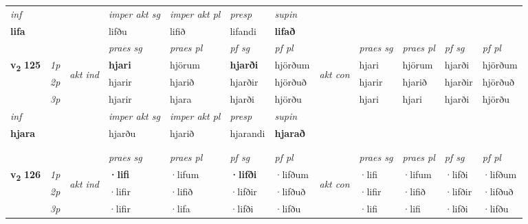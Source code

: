 \begin{longtable}[l]{X>{\footnotesize\itshape}llXXXXlXXXX}
   {\textit{inf}} & &  & \textit{imper akt sg} & \textit{imper akt pl}   & \textit{presp} & \textit{supin}   \\*
  {\textbf{lifa}} & && lifðu  & lifið   & lifandi &  \textbf{lifað}   \\*

\midrule

 & &   & \textit{praes sg}  & \textit{praes pl}    & \textit{ pf sg} & \textit{pf pl} & & \textit{praes sg}  & \textit{praes pl}    & \textit{pf sg} & \textit{pf pl }  \\ \cmidrule{4-7} \cmidrule{9-12}
 \multirow{2}{*}{{{\textbf{v{\textsubscript{2}}} \Large{\textbf{125}}}}}  & 1p & \multirow{3}{*}{\begin{turn}{90}\textit{akt ind}\end{turn}} & \textbf{hjari} & hjörum & \textbf{hjarði} & hjörðum & \multirow{3}{*}{\begin{turn}{90}\textit{akt con}\end{turn}} &hjari & hjörum & hjarði & hjörðum\\*
 & 2p &  &  hjarir  & hjarið & hjarðir & hjörðuð & & hjarir & hjarið & hjarðir & hjörðuð \\*
 & 3p &  & hjarir & hjara & hjarði & hjörðu & & hjari & hjari& hjarði & hjörðu \\*
\cmidrule{4-7} \cmidrule{9-12}

   {\textit{inf}} & &  & \textit{imper akt sg} & \textit{imper akt pl}   & \textit{presp} & \textit{supin}   \\*
  {\textbf{hjara}} & && hjarðu  & hjarið   & hjarandi &  \textbf{hjarað}   \\*

\midrule


   & \\*
  & \\
   \midrule
 & &   & \textit{praes sg}  & \textit{praes pl}    & \textit{ pf sg} & \textit{pf pl} & & \textit{praes sg}  & \textit{praes pl}    & \textit{pf sg} & \textit{pf pl }  \\ \cmidrule{4-7} \cmidrule{9-12}
 \multirow{2}{*}{{{\textbf{v{\textsubscript{2}}} \Large{\textbf{126}}}}}  & 1p & \multirow{3}{*}{\begin{turn}{90}\textit{akt ind}\end{turn}} & \textbf{·lifi} & ·lifum & \textbf{·lifði} & ·lifðum & \multirow{3}{*}{\begin{turn}{90}\textit{akt con}\end{turn}} &·lifi & ·lifum & ·lifði & ·lifðum\\*
 & 2p &  &  ·lifir  & ·lifið & ·lifðir & ·lifðuð & & ·lifir & ·lifið & ·lifðir & ·lifðuð \\*
 & 3p &  & ·lifir & ·lifa & ·lifði & ·lifðu & & ·lifi & ·lifi& ·lifði & ·lifðu \\*
\cmidrule{4-7} \cmidrule{9-12}


\end{longtable}
